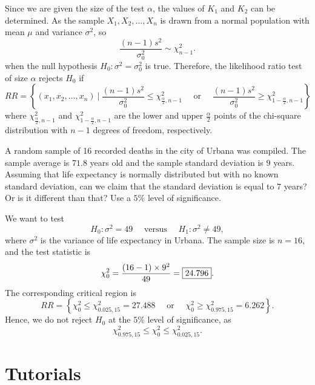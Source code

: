Since we are given the size of the test $\alpha$, the values of $K_1$ and $K_2$ can be determined. 
As the sample $X_1, X_2, \ldots, X_n$ is drawn from a normal population with mean $\mu$ and variance $\sigma^2$,
so 
\begin{equation}
    \frac{(n-1)s^2}{\sigma_0^2} \sim \chi^2_{n-1}.
\end{equation}
when the null hypothesis $H_0 : \sigma^2 = \sigma^2_0$ is true. Therefore, the likelihood ratio test of size $\alpha$ rejects $H_0$ if
\begin{equation}
    RR = \left\{ (x_1, x_2, \ldots, x_n) \> \bigg \vert \> \frac{(n-1)s^2}{\sigma^2_0} \leq \chi^2_{\frac{\alpha}{2}, n-1} \quad \text{ or } \quad \frac{(n-1)s^2}{\sigma^2_0} \geq \chi^2_{1 - \frac{\alpha}{2}, n-1} \right\}
\end{equation}
where $\chi^2_{\frac{\alpha}{2}, n-1}$ and $\chi^2_{1 - \frac{\alpha}{2}, n-1}$ are the lower and upper
$\frac{\alpha}{2}$ points of the chi-square distribution with $n-1$ degrees of freedom, respectively.

\begin{example}
    A random sample of 16 recorded deaths in the city of
 Urbana was compiled. The sample average is $71.8$ years old and the sample
 standard deviation is $9$ years. Assuming that life expectancy is
 normally distributed but with no known standard deviation,
 can we claim that the standard deviation is equal to $7$ years?
 Or is it different than that? Use a $5\%$ level of significance.
\end{example}
\begin{solution}
    We want to test 
    \[
        H_0 : \sigma^2 = 49 \quad \text{ versus } \quad H_1 : \sigma^2 \neq 49,
    \]
    where $\sigma^2$ is the variance of life expectancy in Urbana. The sample size is $n = 16$,
    and the test statistic is 
    \[
        \chi^2_0 = \frac{(16 - 1) \times 9^2}{49} = \fbox{$24.796$}.
    \]
    The corresponding critical region is 
    \[
        RR = \left\{\chi^2_0 \leq \chi^2_{0.025, 15} = 27.488 \quad \text{ or } \quad \chi^2_0 \geq \chi^2_{0.975, 15} = 6.262 \right\}.
    \]
    Hence, we do not reject $H_0$ at the $5\%$ level of significance, as 
    \[
        \chi^2_{0.975, 15} \leq \chi^2_0 \leq \chi^2_{0.025, 15}.
    \]
\end{solution}

\section*{Tutorials}

